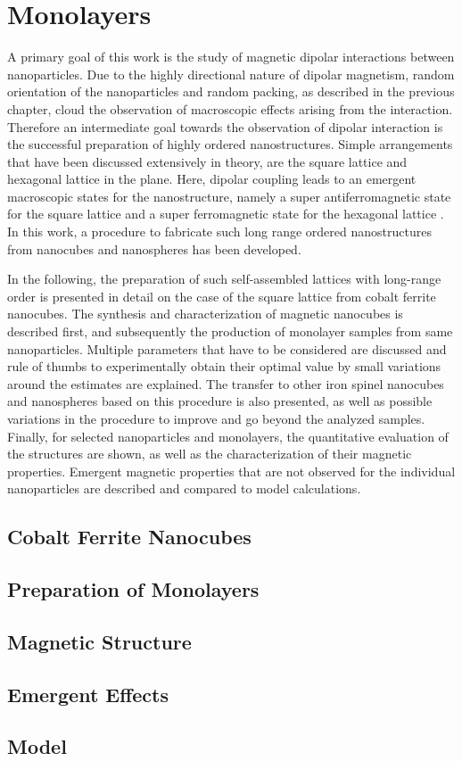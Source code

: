 \documentclass[\main/dresen_thesis.tex]{subfiles}
\renewcommand{\thisPath}{\main/chapters/monolayers}
\begin{document}
  \chapter{Monolayers}\label{ch:monolayers}
    A primary goal of this work is the study of magnetic dipolar interactions between nanoparticles.
    Due to the highly directional nature of dipolar magnetism, random orientation of the nanoparticles and random packing, as described in the previous chapter, cloud the observation of macroscopic effects arising from the interaction.
    Therefore an intermediate goal towards the observation of dipolar interaction is the successful preparation of highly ordered nanostructures.
    Simple arrangements that have been discussed extensively in theory, are the square lattice and hexagonal lattice in the plane.
    Here, dipolar coupling leads to an emergent macroscopic states for the nanostructure, namely a super antiferromagnetic state for the square lattice and a super ferromagnetic state for the hexagonal lattice \cite{Politi_2002_Dipol, Russier_2001_Calcu, Varon_2013_Dipol}.
    In this work, a procedure to fabricate such long range ordered nanostructures from nanocubes and nanospheres has been developed.

    In the following, the preparation of such self-assembled lattices with long-range order is presented in detail on the case of the square lattice from cobalt ferrite nanocubes.
    The synthesis and characterization of magnetic nanocubes is described first, and subsequently the production of monolayer samples from same nanoparticles.
    Multiple parameters that have to be considered are discussed and rule of thumbs to experimentally obtain their optimal value by small variations around the estimates are explained.
    The transfer to other iron spinel nanocubes and nanospheres based on this procedure is also presented, as well as possible variations in the procedure to improve and go beyond the analyzed samples.
    Finally, for selected nanoparticles and monolayers, the quantitative evaluation of the structures are shown, as well as the characterization of their magnetic properties. Emergent magnetic properties that are not observed for the individual nanoparticles are described and compared to model calculations.

    \section{Cobalt Ferrite Nanocubes}
      

    \FloatBarrier
    \section{Preparation of Monolayers}
      

    \FloatBarrier
    \section{Magnetic Structure}
      

    \section{Emergent Effects}

    \section{Model}
\end{document}
